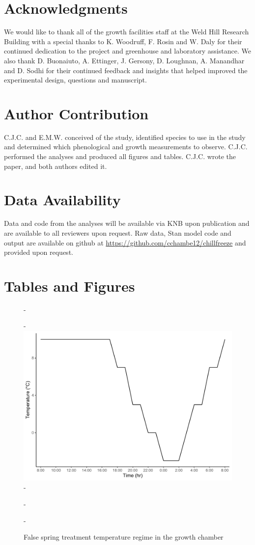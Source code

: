 \documentclass{article}\usepackage[]{graphicx}\usepackage[]{color}
\begin{document}
\begin{enumerate}
\section*{Acknowledgments}
We would like to thank all of the growth facilities staff at the Weld Hill Research Building with a special thanks to K. Woodruff, F. Rosin and W. Daly for their continued dedication to the project and greenhouse and laboratory assistance. We also thank D. Buonaiuto, A. Ettinger, J. Gersony, D. Loughnan, A. Manandhar and D. Sodhi for their continued feedback and insights that helped improved the experimental design, questions and manuscript.

\section*{Author Contribution} 
C.J.C. and E.M.W. conceived of the study, identified species to use in the study and determined which phenological and growth measurements to observe. C.J.C. performed the analyses and produced all figures and tables. C.J.C. wrote the paper, and both authors edited it.

\section*{Data Availability}
Data and code from the analyses will be available via KNB upon publication and are available to all reviewers upon request. Raw data, {Stan} model code and output are available on github at \url{https://github.com/cchambe12/chillfreeze} and provided upon request.




\section*{Tables and Figures}

{\begin{figure} [H]
  -\begin{center}
  -\includegraphics[width=12cm]{..//analyses/figures/growthchamber.pdf}
  -\caption{False spring treatment temperature regime in the growth chamber}\label{fig:gccond}
  -\end{center}
  -\end{figure}}
  

\end{enumerate}
\end{document}
